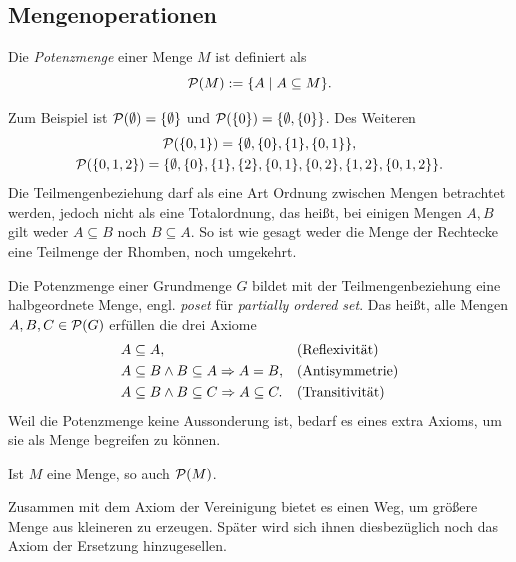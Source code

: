 \newpage
\subsection{Mengenoperationen}

\begin{Definition}[Potenzmenge]\newlinefirst
Die \emph{Potenzmenge} einer Menge $M$ ist definiert als
\[\mathcal P(M) := \{A\mid A\subseteq M\}.\]
\end{Definition}
Zum Beispiel ist $\mathcal P(\emptyset) = \{\emptyset\}$ und
$\mathcal P(\{0\}) = \{\emptyset, \{0\}\}$. Des Weiteren
\begin{gather*}
\mathcal P(\{0,1\}) = \{\emptyset, \{0\}, \{1\}, \{0,1\}\},\\
\mathcal P(\{0,1,2\}) = \{\emptyset, \{0\}, \{1\}, \{2\}, \{0,1\}, \{0,2\}, \{1,2\}, \{0,1,2\}\}.
\end{gather*}
Die Teilmengenbeziehung darf als eine Art Ordnung zwischen Mengen
betrachtet werden, jedoch nicht als eine Totalordnung, das heißt,
bei einigen Mengen $A,B$ gilt weder $A\subseteq B$ noch $B\subseteq A$.
So ist wie gesagt weder die Menge der Rechtecke eine Teilmenge der
Rhomben, noch umgekehrt.

Die Potenzmenge einer Grundmenge $G$ bildet mit der Teilmengenbeziehung
eine halbgeordnete Menge, engl. \emph{poset} für
\emph{partially ordered set}. Das heißt, alle Mengen
$A,B,C\in\mathcal P(G)$ erfüllen die drei Axiome
\begin{align*}
& A\subseteq A, &&\text{(Reflexivität)}\\
& A\subseteq B\land B\subseteq A\Rightarrow A = B, &&\text{(Antisymmetrie)}\\
& A\subseteq B\land B\subseteq C\Rightarrow A\subseteq C. &&\text{(Transitivität)}
\end{align*}
Weil die Potenzmenge keine Aussonderung ist, bedarf es eines extra
Axioms, um sie als Menge begreifen zu können.
\begin{Axiom}[Potenzmenge]\newlinefirst
Ist $M$ eine Menge, so auch $\mathcal P(M)$.
\end{Axiom}
Zusammen mit dem Axiom der Vereinigung bietet es einen Weg, um größere
Menge aus kleineren zu erzeugen. Später wird sich ihnen diesbezüglich
noch das Axiom der Ersetzung hinzugesellen.

